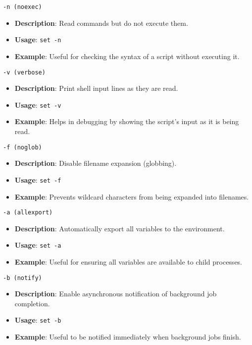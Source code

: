 \documentclass{report}
\begin{document}
    \item \texttt{-n (noexec)}
        \begin{itemize}
            \item \textbf{Description}: Read commands but do not execute them.
            \item \textbf{Usage}: \texttt{set -n}
            \item \textbf{Example}: Useful for checking the syntax of a script without executing it.
        \end{itemize}

    \item \texttt{-v (verbose)}
        \begin{itemize}
            \item \textbf{Description}: Print shell input lines as they are read.
            \item \textbf{Usage}: \texttt{set -v}
            \item \textbf{Example}: Helps in debugging by showing the script’s input as it is being read.
        \end{itemize}

    \item \texttt{-f (noglob)}
        \begin{itemize}
            \item \textbf{Description}: Disable filename expansion (globbing).
            \item \textbf{Usage}: \texttt{set -f}
            \item \textbf{Example}: Prevents wildcard characters from being expanded into filenames.
        \end{itemize}

    \item \texttt{-a (allexport)}
        \begin{itemize}
            \item \textbf{Description}: Automatically export all variables to the environment.
            \item \textbf{Usage}: \texttt{set -a}
            \item \textbf{Example}: Useful for ensuring all variables are available to child processes.
        \end{itemize}

    \item \texttt{-b (notify)}
        \begin{itemize}
            \item \textbf{Description}: Enable asynchronous notification of background job completion.
            \item \textbf{Usage}: \texttt{set -b}
            \item \textbf{Example}: Useful to be notified immediately when background jobs finish.
        \end{itemize}
\end{document}
